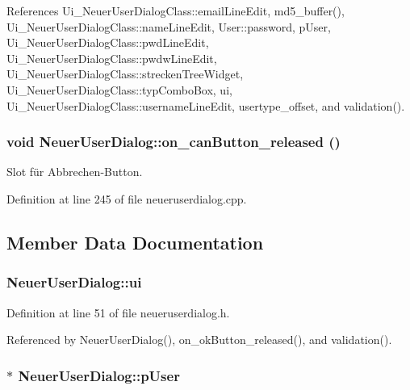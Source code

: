 References Ui\_\-NeuerUserDialogClass::emailLineEdit, md5\_\-buffer(), Ui\_\-NeuerUserDialogClass::nameLineEdit, User::password, pUser, Ui\_\-NeuerUserDialogClass::pwdLineEdit, Ui\_\-NeuerUserDialogClass::pwdwLineEdit, Ui\_\-NeuerUserDialogClass::streckenTreeWidget, Ui\_\-NeuerUserDialogClass::typComboBox, ui, Ui\_\-NeuerUserDialogClass::usernameLineEdit, usertype\_\-offset, and validation().\hypertarget{class_neuer_user_dialog_fd1184d0212d7fda723c67a29d09093a}{
\subsubsection[on\_\-canButton\_\-released]{\setlength{\rightskip}{0pt plus 5cm}void NeuerUserDialog::on\_\-canButton\_\-released ()}}
\label{class_neuer_user_dialog_fd1184d0212d7fda723c67a29d09093a}


Slot für Abbrechen-Button. 



Definition at line 245 of file neueruserdialog.cpp.

\subsection{Member Data Documentation}
\hypertarget{class_neuer_user_dialog_3f6bb409584c450d6ca87973eb0c31b1}{
\subsubsection[ui]{ {\bf NeuerUserDialog::ui}}}
\label{class_neuer_user_dialog_3f6bb409584c450d6ca87973eb0c31b1}




Definition at line 51 of file neueruserdialog.h.

Referenced by NeuerUserDialog(), on\_\-okButton\_\-released(), and validation().\hypertarget{class_neuer_user_dialog_4f0a500dbb82eb6f8c7ca521aab8f332}{
\subsubsection[pUser]{$\ast$ {\bf NeuerUserDialog::pUser}}}
\label{class_neuer_user_dialog_4f0a500dbb82eb6f8c7ca521aab8f332}




